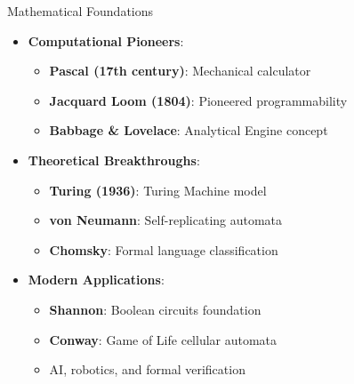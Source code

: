 \documentclass[aspectratio=169,11pt]{beamer}
\newcommand{\concept}[1]{\textbf{\color{accentcolor}#1}}
\begin{document}
\begin{frame}{Mathematical Foundations}
\begin{itemize}
\item \concept{Computational Pioneers}:
\begin{itemize}
\item \textbf{Pascal (17th century)}: Mechanical calculator
\item \textbf{Jacquard Loom (1804)}: Pioneered programmability
\item \textbf{Babbage \& Lovelace}: Analytical Engine concept
\end{itemize}
\vspace{0.5cm}
\item \concept{Theoretical Breakthroughs}:
\begin{itemize}
\item \textbf{Turing (1936)}: Turing Machine model
\item \textbf{von Neumann}: Self-replicating automata
\item \textbf{Chomsky}: Formal language classification
\end{itemize}
\vspace{0.3cm}
\item \concept{Modern Applications}:
\begin{itemize}
\item \textbf{Shannon}: Boolean circuits foundation
\item \textbf{Conway}: Game of Life cellular automata
\item AI, robotics, and formal verification
\end{itemize}
\end{itemize}
\end{frame}

\end{document}
